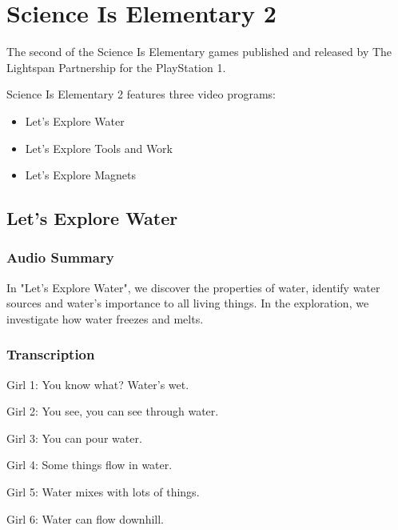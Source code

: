 \chapter{Science Is Elementary 2}


The second of the Science Is Elementary games published and released by The Lightspan Partnership for the PlayStation 1.

Science Is Elementary 2 features three video programs:

\begin{itemize}
    \item Let's Explore Water
    \item Let's Explore Tools and Work
    \item Let's Explore Magnets
\end{itemize}

\clearpage
\newpage

\section{Let's Explore Water}

\subsection{Audio Summary}

In "Let's Explore Water", we discover the properties of water, identify water sources and water's importance to all living things. In the exploration, we investigate how water freezes and melts.

\subsection{Transcription}

Girl 1: You know what? Water's wet.

Girl 2: You see, you can see through water.

Girl 3: You can pour water.

Girl 4: Some things flow in water.

Girl 5: Water mixes with lots of things.

Girl 6: Water can flow downhill.


